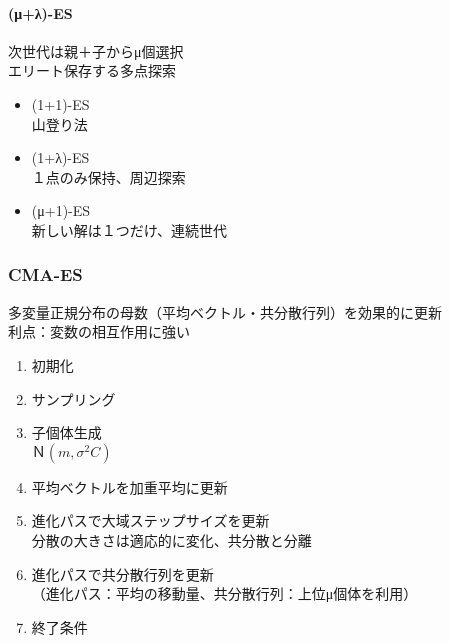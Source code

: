 \documentclass[twocolumn]{jarticle}     %
\begin{document}
\paragraph{(μ+λ)-ES}
次世代は親＋子からμ個選択\\
エリート保存する多点探索
\begin{itemize}
  \item (1+1)-ES\\
  山登り法
  \item (1+λ)-ES\\
  １点のみ保持、周辺探索
  \item (μ+1)-ES\\
  新しい解は１つだけ、連続世代
\end{itemize}

\subsubsection{CMA-ES}
多変量正規分布の母数（平均ベクトル・共分散行列）を効果的に更新\\
利点：変数の相互作用に強い




\begin{enumerate}
  \item 初期化
  \item サンプリング
  \item 子個体生成\\
    $Ｎ(m, σ^2C)$
  \item 平均ベクトルを加重平均に更新
  \item 進化パスで大域ステップサイズを更新\\
    分散の大きさは適応的に変化、共分散と分離
  \item 進化パスで共分散行列を更新\\
      （進化パス：平均の移動量、共分散行列：上位μ個体を利用）
  \item 終了条件
\end{enumerate}
\end{document}
